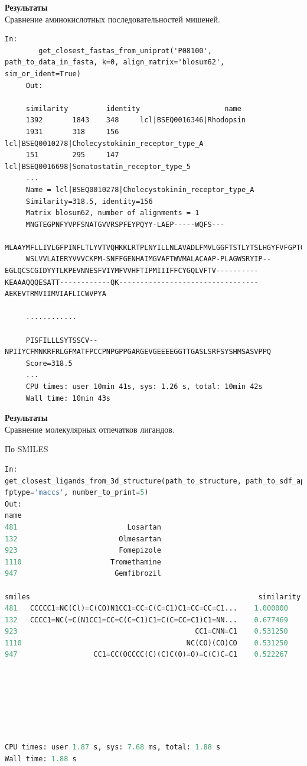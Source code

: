 \documentclass[14pt]{beamer}
\begin{document}
{\textbf{Результаты}}
 \small$\:$\\
 	Сравнение аминокислотных последовательностей мишеней.
     \begin{lstlisting}[label={lst:fasta}, basicstyle=\tiny]
     In:
     	get_closest_fastas_from_uniprot('P08100', path_to_data_in_fasta, k=0, align_matrix='blosum62', sim_or_ident=True)
     Out:
     
     similarity 		identity 					name
     1392 	 	1843 	348  	lcl|BSEQ0016346|Rhodopsin
     1931 	 	318 	156 	lcl|BSEQ0010278|Cholecystokinin_receptor_type_A
     151 	 	295 	147 	lcl|BSEQ0016698|Somatostatin_receptor_type_5
     ...
     Name = lcl|BSEQ0010278|Cholecystokinin_receptor_type_A
     Similarity=318.5, identity=156
     Matrix blosum62, number of alignments = 1
     MNGTEGPNFYVPFSNATGVVRSPFEYPQYY-LAEP-----WQFS---
     MLAAYMFLLIVLGFPINFLTLYVTVQHKKLRTPLNYILLNLAVADLFMVLGGFTSTLYTSLHGYFVFGPTGCNLEGFFATLGGEIAL	
     WSLVVLAIERYVVVCKPM-SNFFGENHAIMGVAFTWVMALACAAP-PLAGWSRYIP--EGLQCSCGIDYYTLKPEVNNESFVIYMFVVHFTIPMIIIFFCYGQLVFTV----------KEAAAQQQESATT------------QK---------------------------------AEKEVTRMVIIMVIAFLICWVPYA
     
     ............
     
     PISFILLLSYTSSCV--NPIIYCFMNKRFRLGFMATFPCCPNPGPPGARGEVGEEEEGGTTGASLSRFSYSHMSASVPPQ
     Score=318.5
     ...
     CPU times: user 10min 41s, sys: 1.26 s, total: 10min 42s
     Wall time: 10min 43s
     \end{lstlisting}

{\textbf{Результаты}}
\small$\:$\\
Сравнение молекулярных отпечатков лигандов.

По SMILES\\

\begin{lstlisting}[basicstyle=\tiny, language=Python, label={lst:sdf-fing},]
In: 
get_closest_ligands_from_3d_structure(path_to_structure, path_to_sdf_approved, root,
fptype='maccs', number_to_print=5)
Out:
name  
481                          Losartan  
132                        Olmesartan  
923                        Fomepizole  
1110                     Tromethamine  
947                       Gemfibrozil  

smiles  													similarity  \
481   CCCCC1=NC(Cl)=C(CO)N1CC1=CC=C(C=C1)C1=CC=CC=C1...    1.000000   
132   CCCC1=NC(=C(N1CC1=CC=C(C=C1)C1=C(C=CC=C1)C1=NN...    0.677469   
923                                          CC1=CNN=C1    0.531250   
1110                                       NC(CO)(CO)CO    0.531250   
947                  CC1=CC(OCCCC(C)(C)C(O)=O)=C(C)C=C1    0.522267 







CPU times: user 1.87 s, sys: 7.68 ms, total: 1.88 s
Wall time: 1.88 s

\end{lstlisting}
\end{document}
